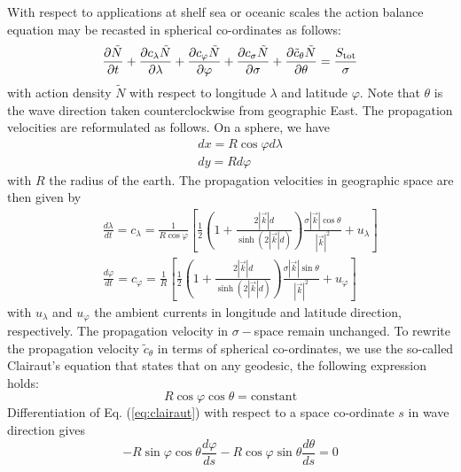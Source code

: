 \documentclass[12pt]{book}
\begin{document}
With respect to applications at shelf sea or oceanic scales the action balance equation may be recasted in
spherical co-ordinates as follows:
\begin{equation}
  \frac{\partial \tilde{N}}{\partial t} + \frac{\partial c_\lambda \tilde{N}}{\partial \lambda} +
  \frac{\partial c_\varphi \tilde{N}}{\partial \varphi} +
  \frac{\partial c_\sigma \tilde{N}}{\partial \sigma} + \frac{\partial \tilde{c}_\theta \tilde{N}}{\partial \theta} =
  \frac{S_{\rm tot}}{\sigma}
  \label{eq:actbal3}
\end{equation}
with action density $\tilde{N}$ with respect to longitude $\lambda$ and latitude $\varphi$.
Note that $\theta$ is the wave direction taken counterclockwise from geographic East. The propagation
velocities are reformulated as follows. On a sphere, we have
\begin{eqnarray}
   &&dx = R \cos \varphi d\lambda \\ \nonumber
   &&dy = R d\varphi
\end{eqnarray}
with $R$ the radius of the earth. The propagation velocities in geographic space are then given by
\begin{eqnarray}
  &&\frac{d\lambda}{dt}  = c_\lambda = \frac{1}{R\cos \varphi} \left [ \frac{1}{2} \left ( 1 +
    \frac{2|\vec{k}|d}{\sinh (2|\vec{k}|d)}\right )
    \frac{\sigma |\vec{k}| \cos \theta}{{|\vec{k}|}^2} + u_\lambda \right ] \\ \nonumber
  &&\frac{d\varphi}{dt}  = c_\varphi = \frac{1}{R} \left [ \frac{1}{2} \left ( 1 +
    \frac{2|\vec{k}|d}{\sinh (2|\vec{k}|d)}\right )
    \frac{\sigma |\vec{k}| \sin \theta}{{|\vec{k}|}^2} + u_\varphi \right ]
\end{eqnarray}
with $u_\lambda$ and $u_\varphi$ the ambient currents in longitude and latitude direction, respectively.
The propagation velocity in $\sigma-$space remain unchanged. To rewrite the propagation velocity $\tilde{c}_\theta$ in terms of
spherical co-ordinates, we use the so-called Clairaut's equation that states that on any geodesic, the following expression
holds:
\begin{equation}
  R \cos \varphi \cos \theta = \mbox{constant}
  \label{eq:clairaut}
\end{equation}
Differentiation of Eq. (\ref{eq:clairaut}) with respect to a space co-ordinate $s$ in wave direction gives
\begin{equation}
  -R \sin \varphi \cos \theta \frac{d\varphi}{ds} - R \cos \varphi \sin \theta \frac{d\theta}{ds} = 0
  \label{eq:derclair}
\end{equation}
\end{document}
